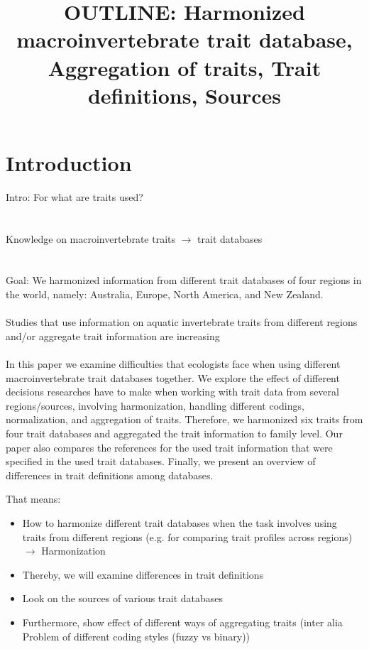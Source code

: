 \documentclass{article}
\title{ OUTLINE: Harmonized macroinvertebrate trait database, Aggregation of traits, Trait definitions, Sources }
\author{}%
\date{}%
\begin{document}
\maketitle

\section{Introduction}

Intro: For what are traits used?
\\
\\
\\
Knowledge on macroinvertebrate traits $\rightarrow$ trait databases
\\
\\
\\
Goal: 
We harmonized information from different trait databases of four regions in the world,
namely: Australia, Europe, North America, and New Zealand. \\
\\
Studies that use information on aquatic invertebrate traits from different regions and/or aggregate trait information 
are increasing %
\\
\\
In this paper we examine difficulties that ecologists face when using different macroinvertebrate trait databases together. 
We explore the effect of different decisions researches have to make when working with trait data from several regions/sources, 
involving harmonization, handling different codings, normalization, and aggregation of traits. 
Therefore, we harmonized six traits from four trait databases and aggregated the trait information to family level. %
Our paper also compares the references for the used trait information that were specified in the used trait databases. 
Finally, we present an overview of differences in trait definitions among databases. 

That means: 
\begin{itemize}
    \item How to harmonize different trait databases when the task involves using 
    traits from different regions (e.g. for comparing trait profiles across regions) $\rightarrow$ Harmonization
    \item Thereby, we will examine differences in trait definitions
    \item Look on the sources of various trait databases 
    \item Furthermore, show effect of different ways of aggregating traits (inter alia Problem of different
     coding styles (fuzzy vs binary))
\end{itemize}
\end{document}
